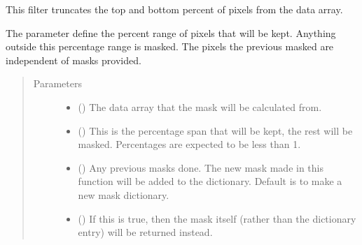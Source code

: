 \documentclass[letterpaper,10pt,english]{sphinxmanual}
\begin{document}
\begin{fulllineitems}
\label{\detokenize{python_docstrings/IfA_Smeargle.echo.masks.masks_echo200:IfA_Smeargle.echo.masks.masks_echo200.echo276_percent_truncation}}
This filter truncates the top and bottom percent of pixels from the
data array.

The parameter  define the percent range of pixels that will
be kept. Anything outside this percentage range is masked. The pixels
the previous masked are independent of masks provided.
\begin{quote}\begin{description}
\item[{Parameters}] \leavevmode\begin{itemize}
\item {} 
 () \textendash{} The data array that the mask will be calculated from.

\item {} 
 () \textendash{} This is the percentage span that will be kept, the rest will be
masked. Percentages are expected to be less than 1.

\item {} 
 (\sphinxstyleliteralemphasis{\sphinxupquote{ (}}\sphinxstyleliteralemphasis{\sphinxupquote{)}}) \textendash{} Any previous masks done. The new mask made in this function will be
added to the dictionary. Default is to make a new mask dictionary.

\item {} 
 (\sphinxstyleliteralemphasis{\sphinxupquote{ (}}\sphinxstyleliteralemphasis{\sphinxupquote{)}}) \textendash{} If this is true, then the mask itself (rather than the dictionary
entry) will be returned instead.


\end{itemize}
\end{description}
\end{quote}
\end{fulllineitems}
\end{document}
